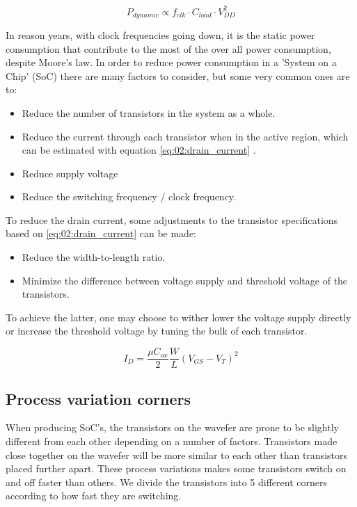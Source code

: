 \begin{equation}
    P_{dynamic} \propto f_{clk} \cdot C_{load} \cdot V_{DD}^2
    \label{eq:02:dynamic_power}
\end{equation}

In reason years, with clock frequencies going down, it is the static power consumption that contribute to the most of the over all power consumption, despite Moore's law. In order to reduce power consumption in a 'System on a Chip' (SoC) there are many factors to consider, but some very common ones are to: 
\begin{itemize}
    \item Reduce the number of transistors in the system as a whole.
    \item Reduce the current through each transistor when in the active region, which can be estimated with equation \ref{eq:02:drain_current} \cite{analog2011}. 
    \item Reduce supply voltage
    \item Reduce the switching frequency / clock frequency.
\end{itemize}


To reduce the drain current, some adjustments to the transistor specifications based on \autoref{eq:02:drain_current} can be made:
\begin{itemize}
    \item Reduce the width-to-length ratio.
    \item Minimize the difference between voltage supply and threshold voltage of the transistors.
\end{itemize}

To achieve the latter, one may choose to wither lower the voltage supply directly or increase the threshold voltage by tuning the bulk of each transistor. 


\begin{equation}
    I_D = \frac{\mu C_{ox}}{2} \frac{W}{L} (V_{GS} - V_T)^2 
    \label{eq:02:drain_current}
\end{equation}


\subsection{Process variation corners}
When producing SoC's, the transistors on the wavefer are prone to be slightly different from each other depending on a number of factors. Transistors made close together on the wavefer will be more similar to each other than transistors placed further apart. These process variations makes some transistors switch on and off faster than others. We divide the transistors into 5 different corners according to how fast they are switching.

